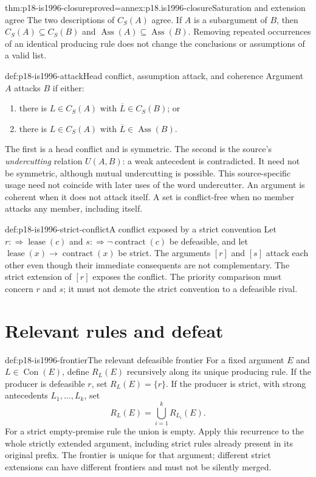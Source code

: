 \begin{hbtheorem}{thm:p18-is1996-closure}{proved=annex:p18.is1996-closure}{Saturation and extension agree}
The two descriptions of \(C_S(A)\) agree. If \(A\) is a
subargument of \(B\), then \(C_S(A)\subseteq C_S(B)\) and
\(\operatorname{Ass}(A)\subseteq\operatorname{Ass}(B)\).
Removing repeated occurrences of an identical producing rule
does not change the conclusions or assumptions of a valid list.
\end{hbtheorem}

\begin{hbdefinition}{def:p18-is1996-attack}{Head conflict, assumption attack, and coherence}
Argument \(A\) attacks \(B\) if either:
\begin{enumerate}
\item there is \(L\in C_S(A)\) with
\(\overline L\in C_S(B)\); or
\item there is \(L\in C_S(A)\) with
\(\overline L\in\operatorname{Ass}(B)\).
\end{enumerate}
The first is a head conflict and is symmetric.
The second is the source's \emph{undercutting} relation
\(U(A,B)\): a weak antecedent is contradicted.
It need not be symmetric, although mutual undercutting is possible.
This source-specific usage need not coincide with later uses of
the word undercutter.
An argument is coherent when it does not attack itself.
A set is conflict-free when no member attacks any member,
including itself.
\end{hbdefinition}

\begin{hbexample}{def:p18-is1996-strict-conflict}{A conflict exposed by a strict convention}
Let \(r:\Rightarrow\operatorname{lease}(c)\) and
\(s:\Rightarrow\neg\operatorname{contract}(c)\) be defeasible,
and let
\(\operatorname{lease}(x)\to\operatorname{contract}(x)\) be strict.
The arguments \([r]\) and \([s]\) attack each other even though
their immediate consequents are not complementary.
The strict extension of \([r]\) exposes the conflict.
The priority comparison must concern \(r\) and \(s\);
it must not demote the strict convention to a defeasible rival.
\end{hbexample}

\section{Relevant rules and defeat}

\begin{hbdefinition}{def:p18-is1996-frontier}{The relevant defeasible frontier}
For a fixed argument \(E\) and \(L\in\operatorname{Con}(E)\),
define \(R_L(E)\) recursively along its unique producing rule.
If the producer is defeasible \(r\), set \(R_L(E)=\{r\}\).
If the producer is strict, with strong antecedents
\(L_1,\ldots,L_k\), set
\[
R_L(E)=\bigcup_{i=1}^k R_{L_i}(E).
\]
For a strict empty-premise rule the union is empty.
Apply this recurrence to the whole strictly extended argument,
including strict rules already present in its original prefix.
The frontier is unique for that argument; different strict
extensions can have different frontiers and must not be silently merged.
\end{hbdefinition}

